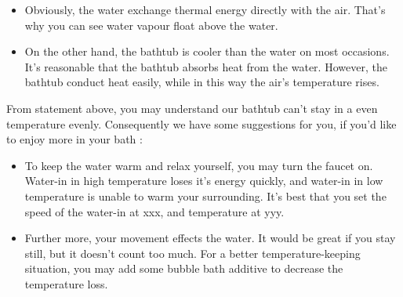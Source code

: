 \documentclass[12pt,a4paper,titlepage]{article}
\begin{document}
\begin{itemize}
\item Obviously, the water exchange thermal energy directly with the air. That's why you can see water vapour float above the water.
\item On the other hand, the bathtub is cooler than the water on most occasions. It's reasonable that the bathtub absorbs heat from the water. However, the bathtub conduct heat easily, while in this way the air's temperature rises.
\end{itemize}
From statement above, you may understand our bathtub can't stay in a even temperature evenly. Consequently we have some suggestions for you, if you'd like to enjoy more in your bath :
\begin{itemize}
\item To keep the water warm and relax yourself, you may turn the faucet on. Water-in in high temperature loses it's energy quickly, and water-in in low temperature is unable to warm your surrounding. It's best that you set the speed of the water-in at xxx, and temperature at yyy.
\item Further more, your movement effects the water. It would be great if you stay still, but it doesn't count too much. For a better temperature-keeping situation, you may add some bubble bath additive to decrease the temperature loss.
\end{itemize}
\end{document}
